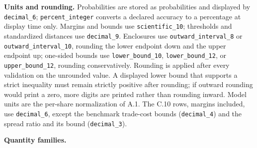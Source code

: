 \documentclass[
  11pt,
]{article}
\begin{document}
\textbf{Units and rounding.} Probabilities are stored as probabilities
and displayed by \texttt{decimal\_6}; \texttt{percent\_integer} converts
a declared accuracy to a percentage at display time only. Margins and
bounds use \texttt{scientific\_10}; thresholds and standardized
distances use \texttt{decimal\_9}. Enclosures use
\texttt{outward\_interval\_8} or \texttt{outward\_interval\_10},
rounding the lower endpoint down and the upper endpoint up; one-sided
bounds use \texttt{lower\_bound\_10}, \texttt{lower\_bound\_12}, or
\texttt{upper\_bound\_12}, rounding conservatively. Rounding is applied
after every validation on the unrounded value. A displayed lower bound
that supports a strict inequality must remain strictly positive after
rounding; if outward rounding would print a zero, more digits are
printed rather than rounding inward. Model units are the per-share
normalization of A.1. The C.10 rows, margins included, use
\texttt{decimal\_6}, except the benchmark trade-cost bounds
(\texttt{decimal\_4}) and the spread ratio and its bound
(\texttt{decimal\_3}).

\textbf{Quantity families.}
\end{document}
